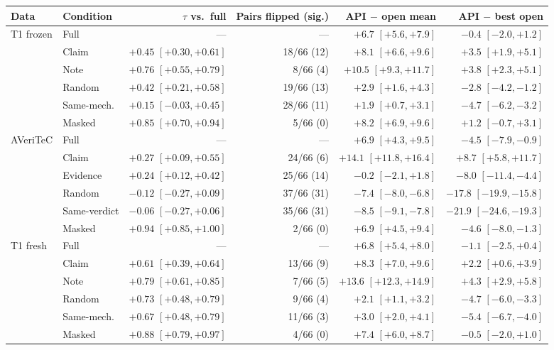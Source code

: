 \begin{tabular}{@{}llrrrr@{}}
\toprule
Data & Condition & $\tau$ vs.\ full & Pairs flipped (sig.) & API $-$ open mean & API $-$ best open \\
\midrule
T1 frozen & Full & --- & --- & $+6.7$ $[+5.6,+7.9]$ & $-0.4$ $[-2.0,+1.2]$ \\
 & Claim & $+0.45$ $[+0.30,+0.61]$ & 18/66 (12) & $+8.1$ $[+6.6,+9.6]$ & $+3.5$ $[+1.9,+5.1]$ \\
 & Note & $+0.76$ $[+0.55,+0.79]$ & 8/66 (4) & $+10.5$ $[+9.3,+11.7]$ & $+3.8$ $[+2.3,+5.1]$ \\
 & Random & $+0.42$ $[+0.21,+0.58]$ & 19/66 (13) & $+2.9$ $[+1.6,+4.3]$ & $-2.8$ $[-4.2,-1.2]$ \\
 & Same-mech. & $+0.15$ $[-0.03,+0.45]$ & 28/66 (11) & $+1.9$ $[+0.7,+3.1]$ & $-4.7$ $[-6.2,-3.2]$ \\
 & Masked & $+0.85$ $[+0.70,+0.94]$ & 5/66 (0) & $+8.2$ $[+6.9,+9.6]$ & $+1.2$ $[-0.7,+3.1]$ \\
\midrule
AVeriTeC & Full & --- & --- & $+6.9$ $[+4.3,+9.5]$ & $-4.5$ $[-7.9,-0.9]$ \\
 & Claim & $+0.27$ $[+0.09,+0.55]$ & 24/66 (6) & $+14.1$ $[+11.8,+16.4]$ & $+8.7$ $[+5.8,+11.7]$ \\
 & Evidence & $+0.24$ $[+0.12,+0.42]$ & 25/66 (14) & $-0.2$ $[-2.1,+1.8]$ & $-8.0$ $[-11.4,-4.4]$ \\
 & Random & $-0.12$ $[-0.27,+0.09]$ & 37/66 (31) & $-7.4$ $[-8.0,-6.8]$ & $-17.8$ $[-19.9,-15.8]$ \\
 & Same-verdict & $-0.06$ $[-0.27,+0.06]$ & 35/66 (31) & $-8.5$ $[-9.1,-7.8]$ & $-21.9$ $[-24.6,-19.3]$ \\
 & Masked & $+0.94$ $[+0.85,+1.00]$ & 2/66 (0) & $+6.9$ $[+4.5,+9.4]$ & $-4.6$ $[-8.0,-1.3]$ \\
\midrule
T1 fresh & Full & --- & --- & $+6.8$ $[+5.4,+8.0]$ & $-1.1$ $[-2.5,+0.4]$ \\
 & Claim & $+0.61$ $[+0.39,+0.64]$ & 13/66 (9) & $+8.3$ $[+7.0,+9.6]$ & $+2.2$ $[+0.6,+3.9]$ \\
 & Note & $+0.79$ $[+0.61,+0.85]$ & 7/66 (5) & $+13.6$ $[+12.3,+14.9]$ & $+4.3$ $[+2.9,+5.8]$ \\
 & Random & $+0.73$ $[+0.48,+0.79]$ & 9/66 (4) & $+2.1$ $[+1.1,+3.2]$ & $-4.7$ $[-6.0,-3.3]$ \\
 & Same-mech. & $+0.67$ $[+0.48,+0.79]$ & 11/66 (3) & $+3.0$ $[+2.0,+4.1]$ & $-5.4$ $[-6.7,-4.0]$ \\
 & Masked & $+0.88$ $[+0.79,+0.97]$ & 4/66 (0) & $+7.4$ $[+6.0,+8.7]$ & $-0.5$ $[-2.0,+1.0]$ \\
\bottomrule
\end{tabular}
